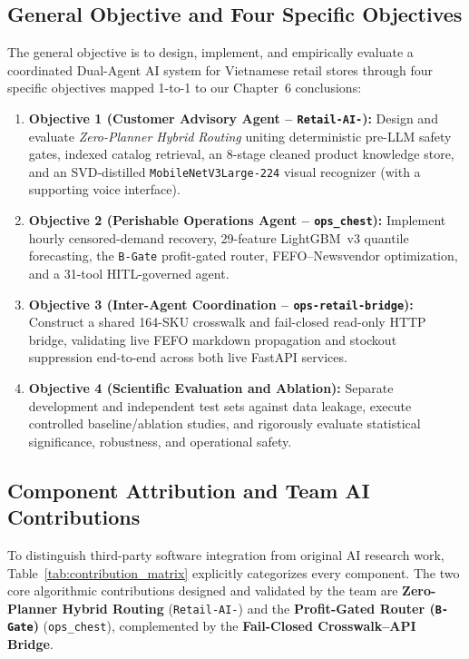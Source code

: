 \subsection*{General Objective and Four Specific Objectives}
The general objective is to design, implement, and empirically evaluate a coordinated Dual-Agent AI system for Vietnamese retail stores through four specific objectives mapped 1-to-1 to our Chapter~6 conclusions:
\begin{enumerate}
    \item \textbf{Objective 1 (Customer Advisory Agent -- \texttt{Retail-AI-}):} Design and evaluate \emph{Zero-Planner Hybrid Routing} uniting deterministic pre-LLM safety gates, indexed catalog retrieval, an 8-stage cleaned product knowledge store, and an SVD-distilled \texttt{MobileNetV3Large-224} visual recognizer (with a supporting voice interface).
    \item \textbf{Objective 2 (Perishable Operations Agent -- \texttt{ops\_chest}):} Implement hourly censored-demand recovery, 29-feature LightGBM~v3 quantile forecasting, the \texttt{B-Gate} profit-gated router, FEFO--Newsvendor optimization, and a 31-tool HITL-governed agent.
    \item \textbf{Objective 3 (Inter-Agent Coordination -- \texttt{ops-retail-bridge}):} Construct a shared 164-SKU crosswalk and fail-closed read-only HTTP bridge, validating live FEFO markdown propagation and stockout suppression end-to-end across both live FastAPI services.
    \item \textbf{Objective 4 (Scientific Evaluation and Ablation):} Separate development and independent test sets against data leakage, execute controlled baseline/ablation studies, and rigorously evaluate statistical significance, robustness, and operational safety.
\end{enumerate}

\subsection*{Component Attribution and Team AI Contributions}
To distinguish third-party software integration from original AI research work, Table~\ref{tab:contribution_matrix} explicitly categorizes every component. The two core algorithmic contributions designed and validated by the team are \textbf{Zero-Planner Hybrid Routing} (\texttt{Retail-AI-}) and the \textbf{Profit-Gated Router (\texttt{B-Gate})} (\texttt{ops\_chest}), complemented by the \textbf{Fail-Closed Crosswalk--API Bridge}.

